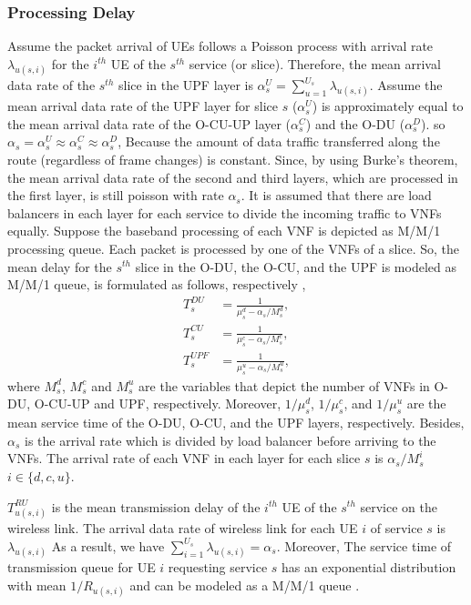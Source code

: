 \documentclass[lettersize,journal]{IEEEtran}
\begin{document}
\subsubsection{Processing Delay}
Assume the packet arrival of UEs follows a Poisson process with arrival rate $\lambda_{u(s,i)}$ for the $i^{th}$ UE of the $s^{th}$ service (or slice).
Therefore, the mean arrival data rate of the $s^{th}$ slice in the UPF layer is $\alpha_{s}^U = \sum_{u=1}^{U_s}\lambda_{u(s,i)}$.
Assume the mean arrival data rate of the UPF layer for slice $s$ ($\alpha_{s}^U$) is approximately equal to the mean arrival data rate of the O-CU-UP layer ($\alpha_{s}^C$) and the O-DU ($\alpha_{s}^D$). so $\alpha_{s} =\alpha_{s}^U \approx \alpha_{s}^C \approx \alpha_{s}^D$,
Because the amount of data traffic transferred along the route (regardless of frame changes) is constant.
Since, by using Burke’s theorem, the mean arrival data rate of the second and third layers, which are processed in the first layer, is still poisson with rate $\alpha_{s}$.
It is assumed that there are load balancers in each layer for each service to divide the incoming traffic to VNFs equally. %
Suppose the baseband processing of each VNF is depicted as M/M/1 processing queue.
Each packet is processed by one of the VNFs of a slice. So, the mean delay for the $s^{th}$ slice in the O-DU, the O-CU, and the UPF is modeled as M/M/1 queue, is formulated as follows, respectively \cite{SystemCostMinimization,luong2018joint,luong2018novel},
\begin{equation}
\begin{split}
T_{s}^{DU} &= \frac{1}{\mu_s^d - \alpha_{s}/{M_s^{d}}},\\
T_{s}^{CU} &= \frac{1}{\mu_s^c - \alpha_{s}/{M_s^{c}}},\\
T_{s}^{UPF} &= \frac{1}{\mu_s^u - \alpha_{s}/{M_s^{u}}},
\end{split}
\end{equation}
where $M_s^{d}$, $M_s^{c}$ and
$M_s^{u}$ are the variables that depict the number of VNFs in O-DU, O-CU-UP and UPF, respectively.
Moreover, $1/\mu_s^d$, $1/\mu_s^c$, and $1/\mu_s^u$ are the mean service time of the O-DU, O-CU, and the UPF layers, respectively.
Besides, $\alpha_{s}$ is the  arrival rate which is divided
by load balancer before arriving to the VNFs. The arrival rate of each VNF in each layer for each slice
$s$ is $\alpha_{s}/{M_s^{i}}$ $ i \in \{d,c, u\}$.

$T_{u(s,i)}^{RU}$ is the mean transmission delay of the $i^{th}$ UE of the $s^{th}$ service on the wireless link.
 The arrival data rate of wireless link for each UE $i$ of service $s$ is $\lambda_{u(s,i)}$
As a result, we have $\sum_{i = 1}^{U_s} \lambda_{u(s,i)} = \alpha_s$.
Moreover, The service time of transmission queue for UE $i$ requesting service $s$ has
an exponential distribution with mean $1/R_{u(s,i)}$ and can be modeled as a M/M/1 queue \cite{SystemCostMinimization,luong2018joint,luong2018novel}.
\end{document}
